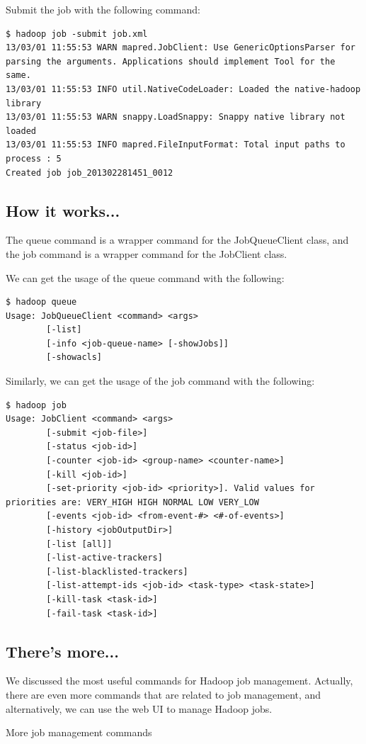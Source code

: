 Submit the job with the following command:
\begin{verbatim}
$ hadoop job -submit job.xml
13/03/01 11:55:53 WARN mapred.JobClient: Use GenericOptionsParser for parsing the arguments. Applications should implement Tool for the same.
13/03/01 11:55:53 INFO util.NativeCodeLoader: Loaded the native-hadoop library
13/03/01 11:55:53 WARN snappy.LoadSnappy: Snappy native library not loaded
13/03/01 11:55:53 INFO mapred.FileInputFormat: Total input paths to process : 5
Created job job_201302281451_0012
\end{verbatim}
\subsection*{How it works...}
The queue command is a wrapper command for the JobQueueClient class, and the job command is a wrapper command for the JobClient class.

We can get the usage of the queue command with the following:
\begin{verbatim}
$ hadoop queue
Usage: JobQueueClient <command> <args>
        [-list]
        [-info <job-queue-name> [-showJobs]]
        [-showacls]
\end{verbatim}

Similarly, we can get the usage of the job command with the following:
\begin{verbatim}
$ hadoop job
Usage: JobClient <command> <args>
        [-submit <job-file>]
        [-status <job-id>]
        [-counter <job-id> <group-name> <counter-name>]
        [-kill <job-id>]
        [-set-priority <job-id> <priority>]. Valid values for priorities are: VERY_HIGH HIGH NORMAL LOW VERY_LOW
        [-events <job-id> <from-event-#> <#-of-events>]
        [-history <jobOutputDir>]
        [-list [all]]
        [-list-active-trackers]
        [-list-blacklisted-trackers]
        [-list-attempt-ids <job-id> <task-type> <task-state>]
        [-kill-task <task-id>]
        [-fail-task <task-id>]
\end{verbatim}
\subsection*{There's more...}
We discussed the most useful commands for Hadoop job management. Actually, there are even more commands that are related to job management, and alternatively, we can use the web UI to manage Hadoop jobs.

More job management commands

